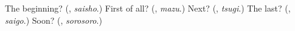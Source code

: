\begin{tcolorbox}[breakable,colback=teal!4,colframe=teal!35!black,title={Before you move on}]
The beginning? (\textbf{}, \emph{saisho}.) First of all? (\textbf{}, \emph{mazu}.) Next? (\textbf{}, \emph{tsugi}.) The last? (\textbf{}, \emph{saigo}.) Soon? (\textbf{}, \emph{sorosoro}.)
\end{tcolorbox}
